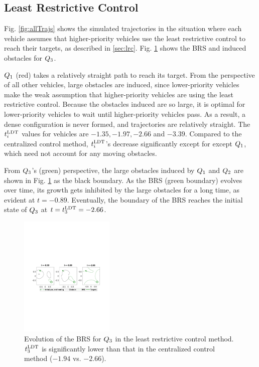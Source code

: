\subsection{Least Restrictive Control}
Fig. \ref{fig:allTrajs} shows the simulated trajectories in the situation where each vehicle assumes that higher-priority vehicles use the least restrictive control to reach their targets, as described in \ref{sec:lrc}. Fig. \ref{fig:lrc_rs3} shows the BRS and induced obstacles for $Q_3$.

$Q_1$ (red) takes a relatively straight path to reach its target. From the perspective of all other vehicles, large obstacles are induced, since lower-priority vehicles make the weak assumption that higher-priority vehicles are using the least restrictive control. Because the obstacles induced are so large, it is optimal for lower-priority vehicles to wait until higher-priority vehicles pass. As a result, a dense configuration is never formed, and trajectories are relatively straight. The $t^\text{LDT}_i$ values for vehicles are $-1.35, -1.97, -2.66$ and $-3.39$. Compared to the centralized control method, $t^\text{LDT}_i$'s decrease significantly except for except $Q_1$, which need not account for any moving obstacles. 

From $Q_3$'s (green) perspective, the large obstacles induced by $Q_1$ and $Q_2$ are shown in Fig. \ref{fig:lrc_rs3} as the black boundary. As the BRS (green boundary) evolves over time, its growth gets inhibited by the large obstacles for a long time, as evident at $t=-0.89$. Eventually, the boundary of the BRS reaches the initial state of $Q_3$ at $t = t^\text{LDT}_3 = -2.66$.
%
%
\begin{figure}[H]
  \centering
  \includegraphics[width=0.4\textwidth]{"fig/lrc_rs3"}
  \caption{Evolution of the BRS for $Q_3$ in the least restrictive control method. $t^\text{LDT}_3$ is significantly lower than that in the centralized control method ($-1.94$ vs. $-2.66$).}
  \label{fig:lrc_rs3}
\end{figure}